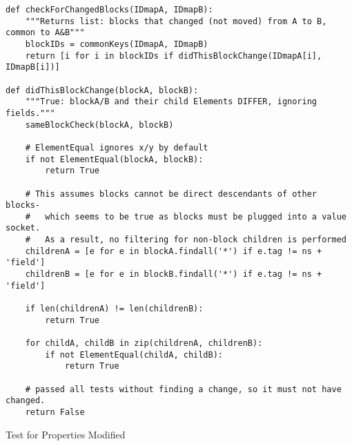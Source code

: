 \begin{listing}[]
\begin{verbatim}
def checkForChangedBlocks(IDmapA, IDmapB):
    """Returns list: blocks that changed (not moved) from A to B, common to A&B"""
    blockIDs = commonKeys(IDmapA, IDmapB)
    return [i for i in blockIDs if didThisBlockChange(IDmapA[i], IDmapB[i])]

def didThisBlockChange(blockA, blockB):
    """True: blockA/B and their child Elements DIFFER, ignoring fields."""
    sameBlockCheck(blockA, blockB)

    # ElementEqual ignores x/y by default
    if not ElementEqual(blockA, blockB):
        return True

    # This assumes blocks cannot be direct descendants of other blocks-
    #   which seems to be true as blocks must be plugged into a value socket.
    #   As a result, no filtering for non-block children is performed
    childrenA = [e for e in blockA.findall('*') if e.tag != ns + 'field']
    childrenB = [e for e in blockB.findall('*') if e.tag != ns + 'field']

    if len(childrenA) != len(childrenB):
        return True

    for childA, childB in zip(childrenA, childrenB):
        if not ElementEqual(childA, childB):
            return True

    # passed all tests without finding a change, so it must not have changed.
    return False
\end{verbatim}
\caption{Test for Properties Modified}
\label{src:lst:properties-modified}
\end{listing}




